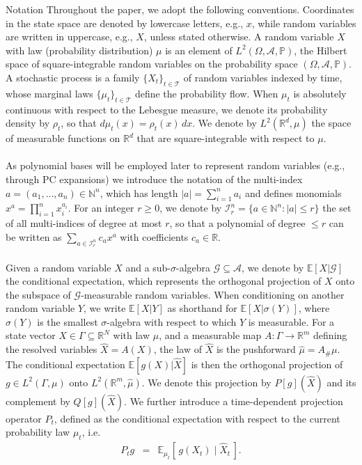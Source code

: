 \documentclass[11pt, a4paper, oneside, reqno]{amsart}
\makeatletter
\def\subsection{\@startsection{subsection}{2}%
	\z@{.5\linespacing\@plus.7\linespacing}{.5\linespacing}%
	{\normalfont\large\bfseries}}
\makeatother
\begin{document}
\subsection{Notation}
\noindent Throughout the paper, we adopt the following conventions. Coordinates in the state space are denoted by lowercase letters, e.g., $x$, while random variables are written in uppercase, e.g., $X$, unless stated otherwise. A random variable $X$ with law (probability distribution) $\mu$ is an element of $L^2(\Omega,\mathcal{A},\mathbb{P})$, the Hilbert space of square-integrable random variables on the probability space $(\Omega,\mathcal{A},\mathbb{P})$. A stochastic process is a family $\{X_t\}_{t\in\mathcal{T}}$ of random variables indexed by time, whose marginal laws $\{\mu_t\}_{t\in\mathcal{T}}$ define the probability flow. When $\mu_t$ is absolutely continuous with respect to the Lebesgue measure, we denote its probability density by $\rho_t$, so that $d\mu_t(x)=\rho_t(x)\,dx$. We denote by $L^2(\mathbb{R}^d,\mu)$ the space of measurable functions on $\mathbb{R}^d$ that are square-integrable with respect to $\mu$. \\ \ \\
As polynomial bases will be employed later to represent random variables (e.g., through PC expansions) we introduce the notation of the multi-index  $a=(a_1,\ldots,a_n)\in\mathbb{N}^n$, which has length $|a|=\sum_{i=1}^n a_i$ and defines monomials $x^a=\prod_{i=1}^n x_i^{a_i}$. For an integer $r\ge0$, we denote by $\mathcal{I}_r^n=\{a\in\mathbb{N}^n:|a|\le r\}$ the set of all multi-indices of degree at most $r$, so that a polynomial of degree $\le r$ can be written as $\sum_{a\in \mathcal{I}_r^n} c_a x^a$ with coefficients $c_a\in\mathbb{R}$. \\ \ \\
Given a random variable $X$ and a sub-$\sigma$-algebra $\mathcal{G}\subseteq\mathcal{A}$, we denote by $\mathbb{E}[X|\mathcal{G}]$ the conditional expectation, which represents the orthogonal projection of $X$ onto the subspace of $\mathcal{G}$-measurable random variables. When conditioning on another random variable $Y$, we write $\mathbb{E}[X|Y]$ as shorthand for $\mathbb{E}[X|\sigma(Y)]$, where $\sigma(Y)$ is the smallest $\sigma$-algebra with respect to which $Y$ is measurable. For a state vector $X\in\Gamma\subseteq\mathbb{R}^N$ with law $\mu$, and a measurable map $A:\Gamma\to\mathbb{R}^m$ defining the resolved variables 
$\hat X=A(X)$,
the law of $\hat X$ is the pushforward $\hat{\mu}=A_\#\mu$. The conditional expectation $\mathbb{E}[g(X)|\hat X]$ is then the orthogonal projection of $g\in L^2(\Gamma,\mu)$ onto $L^2(\mathbb{R}^m,\hat\mu)$. We denote this projection by $P[g](\hat X)$ and its complement by $Q[g](\hat X)$. We further introduce a {time-dependent projection operator} $P_t$, defined as the conditional expectation with respect to the current probability law $\mu_t$, i.e. 
\begin{eqnarray}
P_t g &=& \mathbb{E}_{\mu_t}[\,g(X_t)\mid \hat{X}_t\,]. \nonumber
\end{eqnarray}
\end{document}
